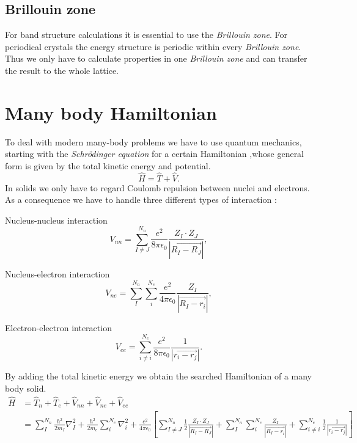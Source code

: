 		\subsection{Brillouin zone}
			For band structure calculations it is essential to use the \textit{Brillouin zone}. For periodical crystals the energy structure is periodic within every \textit{Brillouin zone}. Thus we only have to calculate properties in one \textit{Brillouin zone} and can transfer the result to the whole lattice.
	
	\section{Many body Hamiltonian}
		To deal with modern many-body problems we have to use quantum mechanics, starting with the \textit{Schrödinger equation} for a certain Hamiltonian ,whose general form is given by the total kinetic energy and potential.
		\begin{equation}
			\label{eq:generalHamiltonian}
			\hat H = \hat T + \hat V.
		\end{equation}
		In solids we only have to regard Coulomb repulsion between nuclei and electrons. As a consequence we have to handle three different types of interaction :\\
		\begin{compactenum}[I]
			\item Nucleus-nucleus interaction
				\begin{equation}
					V_{nn} = \sum_{I \neq J}^{N_n} \frac{e^2}{8 \pi \epsilon_0} \frac{Z_I \cdot Z_J}{|\vec{R_I - R_J}|},
				\end{equation}
				
				
			\item Nucleus-electron interaction
				\begin{equation}
					V_{ne} = \sum_{I}^{N_n} \sum_{i}^{N_e} \frac{e^2}{4 \pi \epsilon_0} \frac{Z_I}{|\vec{R_I - r_i}|},
				\end{equation}
				
			\item Electron-electron interaction
				\begin{equation}
					V_{ee} = \sum_{i \neq i}^{N_e} \frac{e^2}{8 \pi \epsilon_0} \frac{1}{|\vec{r_i - r_j}|}.
				\end{equation}
		\end{compactenum}
		By adding the total kinetic energy we obtain the searched Hamiltonian of a many body solid.
		\begin{equation}
			\label{eq:manyBodyHamiltionian}
			\begin{split}
				\hat H &= \hat T_n + \hat T_e + \hat V_{nn} + \hat V_{ne} + \hat V_{ee} \\
				&= \sum_{I}^{N_n}\frac{h^2}{2m_I} \nabla_I^2 + \frac{h^2}{2m_e} \sum_{i}^{N_e} \nabla_i^2 + \frac{e^2}{4 \pi \epsilon_0} \left[ \sum_{I \neq J}^{N_n} \frac{1}{2} \frac{Z_I \cdot Z_J}{|\vec{R_I - R_J}|} + \sum_{I}^{N_n} \sum_{i}^{N_e}  \frac{Z_I}{|\vec{R_I - r_i}|} + \sum_{i \neq i}^{N_e} \frac{1}{2} \frac{1}{|\vec{r_i - r_j}|} \right]
			\end{split}	
		\end{equation}

